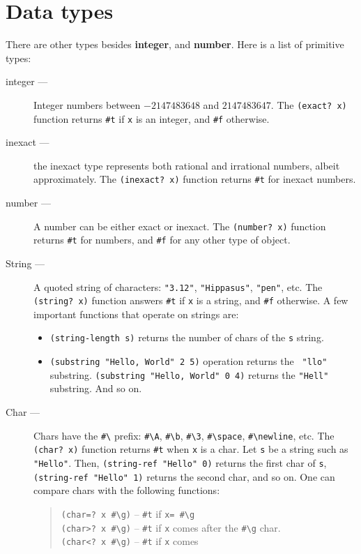 \documentclass[a4paper,12pt]{book}
\begin{document}
\section{Data types}
There are other types
besides {\bf integer}, and {\bf number}. 
Here is a  list of primitive types:
\begin{description}
\item[integer ---] Integer numbers between $-2147483648$ and $2147483647$.
  The \verb|(exact? x)| function returns \verb|#t| if \verb|x|
  is an integer, and \verb|#f| otherwise.
\item[inexact ---] the inexact type represents both
rational and irrational numbers, albeit approximately.
The \verb|(inexact? x)| function returns \verb|#t| for
inexact numbers.
\item[number ---] A number can be either exact or inexact.
 The \verb|(number? x)| function returns \verb|#t| for numbers,
and \verb|#f| for any other type of object.
\item[String ---] A quoted string 
of characters: \verb|"3.12"|, \verb|"Hippasus"|, \verb|"pen"|, etc.
The \verb|(string? x)| function answers \verb|#t| 
if \verb|x| is a string, and \verb|#f| otherwise.
A few important functions that operate on strings are:
\begin{itemize}
\item \verb|(string-length s)| returns the number
of chars of the \verb|s| string.
\item\verb|(substring "Hello, World" 2 5)| operation
  returns the \verb| "llo"| substring.
  \verb|(substring "Hello, World" 0 4)| returns the
  \verb|"Hell"| substring. And so on.
\end{itemize}
\item[Char ---] Chars have the \verb|#\| prefix: 
\verb|#\A|,
\verb|#\b|, \verb|#\3|, \verb|#\space|,
\verb|#\newline|, etc.
The \verb|(char? x)| function returns \verb|#t|
when \verb|x| is a char. Let \verb|s| be
a string such as \verb|"Hello"|. Then,
\verb|(string-ref "Hello" 0)|
returns the first char of \verb|s|,
\verb|(string-ref "Hello" 1)| returns
the second char, and so on. One can compare
chars with the following functions:
\begin{quote}
  \verb|(char=? x #\g)| -- \verb|#t| if \verb|x= #\g|\\
  \verb|(char>? x #\g)| -- \verb|#t| if \verb|x| comes
  after the \verb|#\g| char.\\
  \verb|(char<? x #\g)| -- \verb|#t| if \verb|x| comes

\end{quote}
\end{description}
\end{document}
